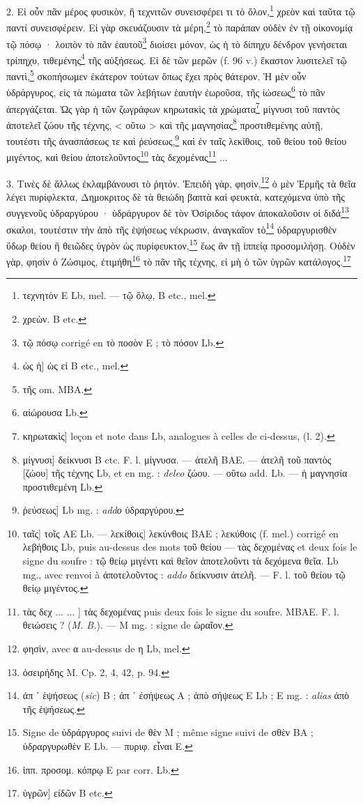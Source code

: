 \documentclass[a4paper, 11pt, oneside, polutonikogreek, french]{article}
\begin{document}
2. Εἰ οὖν πᾶν μέρος φυσικὸν, ἢ τεχνιτῶν συνεισφέρει τι τὸ ὅλον,\footnote{τεχνητὸν E Lb, mel. --- τῷ ὅλῳ, B etc., mel.} χρεὸν καὶ ταῦτα τῷ παντί συνεισφέρειν. Εἰ γὰρ σκευάζουσιν τὰ μέρη,\footnote{χρεὼν. B etc.} τὸ παράπαν οὐδὲν ἐν τῇ οἰκονομίᾳ τῷ πόσῳ · λοιπὸν τὸ πᾶν ἑαυτοῦ\footnote{τῷ πόσῳ corrigé en τὸ ποσὸν E ; τὸ πόσον Lb.} διοίσει μόνον, ὡς ἡ τὸ δίπηχυ δένδρον γενήσεται τρίπηχυ, τιθεμένης\footnote{ὡς ἡ] ὡς εἰ B etc., mel.} τῆς αὐξήσεως. Εἰ δὲ τῶν μερῶν (f. 96 v.) ἕκαστον λυσιτελεῖ τῷ παντὶ,\footnote{τῆς om. MBA.} σκοπήσωμεν ἑκάτερον τούτων ὅπως ἔχει πρὸς θάτερον. Ἡ μὲν οὖν ὑδράργυρος, εἰς τὰ πώματα τῶν λεβήτων ἑαυτὴν ἐωροῦσα, τῆς ἰώσεως\footnote{αἰώρουσα Lb.} τὸ πᾶν ἀπεργάζεται. Ὡς γὰρ ἡ τῶν ζωγράφων κηρωτακὶς τὰ χρώματα\footnote{κηρωτακὶς] leçon et note dans Lb, analogues à celles de ci-dessus, (l. 2).} μίγνυσι τοῦ παντὸς ἀποτελεῖ ζώου τῆς τέχνης, < οὕτω > καὶ τῆς μαγνησίας\footnote{μίγνυσι] δείκνυσι B ctc. F. l. μίγνυσα. --- ἀτελῆ BAE. --- ἀτελῆ τοῦ παντὸς [ζώου] τῆς τέχνης Lb, et en mg. : \emph{deleo} ζώου. --- οὕτω add. Lb. --- ἡ μαγνησία προστιθεμένη Lb.} προστιθεμένης αὐτῇ, τουτέστι τῆς ἀνασπάσεως τε καὶ ῥεύσεως,\footnote{ῥεύσεως] Lb mg. : \emph{addο} ὑδραργύρου.} καὶ ἐν ταῖς λεκίθοις, τοῦ θείου τοῦ θείου μιγέντος, καὶ θείου ἀποτελοῦντος\footnote{ταῖς] τοῖς AE Lb. --- λεκίθοις] λεκύνθοις BAE ; λεκύθοις (f. mel.) corrigé en λεβήθοις Lb, puis au-dessus des mots τοῦ θείου --- τὰς δεχομένας et deux fois le signe du soufre : τῷ θείῳ μιγέντι καὶ θεῖον ἀποτελοῦντι τὰ δεχόμενα θεῖα. Lb mg., avec renvoi à ἀποτελοῦντος : \emph{addo} δείκνυσιν ἀτελῆ. --- F. l. τοῦ θείου τῷ θείῳ μιγέντος.} τὰς δεχομένας\footnote{τὰς δεχ ... ... ] τὰς δεχομένας puis deux fois le signe du soufre. MBAE. F. l. θειώσεις ? (\emph{M. B.}). --- M mg. : signe de ὡραῖον.} ...

3. Τινὲς δὲ ἄλλως ἐκλαμβάνουσι τὸ ῥητόν. Ἐπειδὴ γὰρ, φησὶν,\footnote{φησὶν, avec α au-dessus de η Lb, mel.} ὁ μὲν Ἑρμῆς τὰ θεῖα λέγει πυρίφλεκτα, Δημοκριτος δὲ τὰ θειώδη βαπτὰ καὶ φευκτὰ, κατεχόμενα ὑπὸ τῆς συγγενοῦς ὑδραργύρου · ὑδράργυρον δὲ τὸν Ὀσίριδος τάφον ἀποκαλοῦσιν οἱ διδά\footnote{ὀσειρήδης M. Cp. 2, 4, 42, p. 94.} σκαλοι, τουτέστιν τὴν ἀπὸ τῆς ἑψήσεως νέκρωσιν, ἀναγκαῖον τὸ\footnote{ἀπ ᾽ ἑψήσεως (\emph{sic}) B ; ἀπ ᾽ ἐσήψεως A ; ἀπὸ σήψεως E Lb ; E mg. : \emph{alias} ἀπὸ τῆς ἑψήσεως.} ὑδραργυρισθὲν ὕδωρ θείου ἢ θειῶδες ὑγρὸν ὡς πυρίφευκτον,\footnote{Signe de ὑδράργυρος suivi de θὲν M ; même signe suivi de σθὲν BA ; ὑδραργυρωθὲν E Lb. --- πυριφ. εἶναι E.} ἕως ἂν τῇ ἱππείᾳ προσομιλήσῃ. Οὐδὲν γὰρ, φησὶν ὁ Ζώσιμος, ἐτιμήθη\footnote{ἱππ. προσομ. κόπρῳ E par corr. Lb.} τὸ πᾶν τῆς τέχνης, εἰ μὴ ὁ τῶν ὑγρῶν κατάλογος.\footnote{ὑγρῶν] εἰδῶν B etc.}
\end{document}

